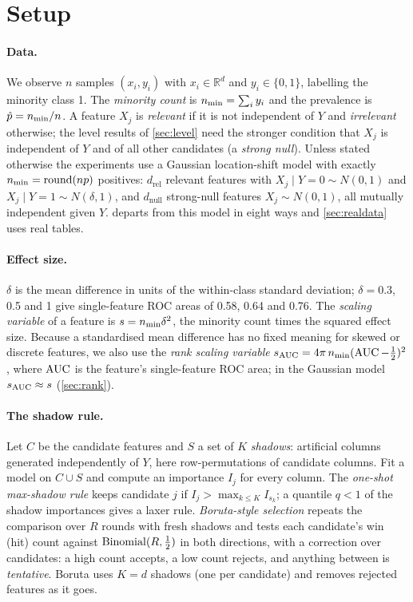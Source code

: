 \section{Setup}\label{sec:setup}

\paragraph{Data.} We observe $n$ samples $(x_i, y_i)$ with $x_i\in\mathbb R^d$ and $y_i\in\{0,1\}$, labelling the minority class 1. The \emph{minority count} is $n_{\min} = \sum_i y_i$ and the prevalence is $\hat p = n_{\min}/n$. A feature $X_j$ is \emph{relevant} if it is not independent of $Y$ and \emph{irrelevant} otherwise; the level results of \cref{sec:level} need the stronger condition that $X_j$ is independent of $Y$ and of all other candidates (a \emph{strong null}). Unless stated otherwise the experiments use a Gaussian location-shift model with exactly $n_{\min} = \operatorname{round}(np)$ positives: $d_{\text{rel}}$ relevant features with $X_j\mid Y{=}0\sim N(0,1)$ and $X_j\mid Y{=}1\sim N(\delta,1)$, and $d_{\text{null}}$ strong-null features $X_j\sim N(0,1)$, all mutually independent given $Y$.  departs from this model in eight ways and \cref{sec:realdata} uses real tables.

\paragraph{Effect size.} $\delta$ is the mean difference in units of the within-class standard deviation; $\delta = 0.3$, 0.5 and 1 give single-feature ROC areas of 0.58, 0.64 and 0.76. The \emph{scaling variable} of a feature is $s = n_{\min}\delta^2$, the minority count times the squared effect size. Because a standardised mean difference has no fixed meaning for skewed or discrete features, we also use the \emph{rank scaling variable} $s_{\mathrm{AUC}} = 4\pi\,n_{\min}(\operatorname{AUC} - \tfrac12)^2$, where $\operatorname{AUC}$ is the feature's single-feature ROC area; in the Gaussian model $s_{\mathrm{AUC}} \approx s$ (\cref{sec:rank}).

\paragraph{The shadow rule.} Let $C$ be the candidate features and $S$ a set of $K$ \emph{shadows}: artificial columns generated independently of $Y$, here row-permutations of candidate columns. Fit a model on $C\cup S$ and compute an importance $I_j$ for every column. The \emph{one-shot max-shadow rule} keeps candidate $j$ if $I_j > \max_{k\le K} I_{s_k}$; a quantile $q < 1$ of the shadow importances gives a laxer rule. \emph{Boruta-style selection} \citep{kursa2010boruta} repeats the comparison over $R$ rounds with fresh shadows and tests each candidate's win (hit) count against $\operatorname{Binomial}(R,\tfrac12)$ in both directions, with a correction over candidates: a high count accepts, a low count rejects, and anything between is \emph{tentative}. Boruta uses $K = d$ shadows (one per candidate) and removes rejected features as it goes.

